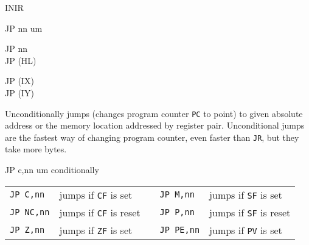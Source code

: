\begin{basedescript}{
    \desclabelstyle{\multilinelabel}
    \desclabelwidth{3cm}}
\begin{DetailItem}{INIR}
    \end{DetailItem}

    \pagebreak
    \begin{DetailItem}{JP nn}
        {um}
        {}

        \begin{DetailVariants}
            JP nn\\
            JP (HL)
			
            \columnbreak
            JP (IX)\\
            JP (IY)
        \end{DetailVariants}

        Unconditionally jumps (changes program counter {\tt PC} to point) to given absolute address or the memory location addressed by register pair. Unconditional jumps are the fastest way of changing program counter, even faster than {\tt JR}, but they take more bytes.

        \begin{DetailEffects}
            \FlagsJPnn
        \end{DetailEffects}
				
        \begin{DetailTiming}
        \end{DetailTiming}

    \end{DetailItem}

    \begin{DetailItem}{JP c,nn}
        {um conditionally}
        {}

        \vspace{1ex} %
        \begin{tabular}{@{}llcll}			
            {\tt JP C,nn} & jumps if {\tt CF} is set & &
                {\tt JP M,nn} & jumps if {\tt SF} is set\\

            {\tt JP NC,nn} & jumps if {\tt CF} is reset & &
                {\tt JP P,nn} & jumps if {\tt SF} is reset\\

            {\tt JP Z,nn} & jumps if {\tt ZF} is set & &
                {\tt JP PE,nn} & jumps if {\tt PV} is set\\


\end{tabular}
\end{DetailItem}
\end{basedescript}
